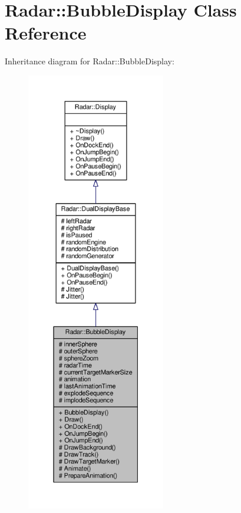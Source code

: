 \hypertarget{classRadar_1_1BubbleDisplay}{}\section{Radar\+:\+:Bubble\+Display Class Reference}
\label{classRadar_1_1BubbleDisplay}


Inheritance diagram for Radar\+:\+:Bubble\+Display\+:
\nopagebreak
\begin{figure}[H]
\begin{center}
\leavevmode
\includegraphics[height=550pt]{d2/d0b/classRadar_1_1BubbleDisplay__inherit__graph}
\end{center}
\end{figure}


